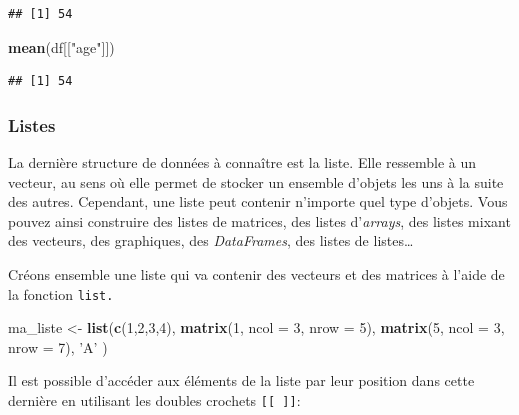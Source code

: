 \documentclass[
  11pt,
  french,
]{book}
\makeatletter
\newenvironment{Shaded}{\begin{snugshade}}{\end{snugshade}}
\newcommand{\DataTypeTok}[1]{\textcolor[rgb]{0.13,0.29,0.53}{#1}}
\newcommand{\DecValTok}[1]{\textcolor[rgb]{0.00,0.00,0.81}{#1}}
\newcommand{\KeywordTok}[1]{\textcolor[rgb]{0.13,0.29,0.53}{\textbf{#1}}}
\newcommand{\NormalTok}[1]{#1}
\newcommand{\StringTok}[1]{\textcolor[rgb]{0.31,0.60,0.02}{#1}}
\newenvironment{kframe}{%
\medskip{}
\setlength{\fboxsep}{.8em}
 \def\at@end@of@kframe{}%
 \ifinner\ifhmode%
  \def\at@end@of@kframe{\end{minipage}}%
  \begin{minipage}{\columnwidth}%
 \fi\fi%
 \def\FrameCommand##1{\hskip\@totalleftmargin \hskip-\fboxsep
 \colorbox{shadecolor}{##1}\hskip-\fboxsep
     \hskip-\linewidth \hskip-\@totalleftmargin \hskip\columnwidth}%
 \MakeFramed {\advance\hsize-\width
   \@totalleftmargin\z@ \linewidth\hsize
   \@setminipage}}%
 {\par\unskip\endMakeFramed%
 \at@end@of@kframe}
\renewenvironment{Shaded}{\begin{kframe}}{\end{kframe}}
\makeatother
\begin{document}
\begin{verbatim}
## [1] 54
\end{verbatim}

\begin{Shaded}
\begin{Highlighting}[]
\KeywordTok{mean}\NormalTok{(df[[}\StringTok{"age"}\NormalTok{]])}
\end{Highlighting}
\end{Shaded}

\begin{verbatim}
## [1] 54
\end{verbatim}

\hypertarget{sect01365}{%
\subsubsection{Listes}\label{sect01365}}

La dernière structure de données à connaître est la liste. Elle ressemble à un vecteur, au sens où elle permet de stocker un ensemble d'objets les uns à la suite des autres. Cependant, une liste peut contenir n'importe quel type d'objets. Vous pouvez ainsi construire des listes de matrices, des listes d'\emph{arrays}, des listes mixant des vecteurs, des graphiques, des \emph{DataFrames}, des listes de listes\ldots{}

Créons ensemble une liste qui va contenir des vecteurs et des matrices à l'aide de la fonction \texttt{list.}

\begin{Shaded}
\begin{Highlighting}[]
\NormalTok{ma_liste <-}\StringTok{ }\KeywordTok{list}\NormalTok{(}\KeywordTok{c}\NormalTok{(}\DecValTok{1}\NormalTok{,}\DecValTok{2}\NormalTok{,}\DecValTok{3}\NormalTok{,}\DecValTok{4}\NormalTok{),}
                 \KeywordTok{matrix}\NormalTok{(}\DecValTok{1}\NormalTok{, }\DataTypeTok{ncol =} \DecValTok{3}\NormalTok{, }\DataTypeTok{nrow =} \DecValTok{5}\NormalTok{),}
                 \KeywordTok{matrix}\NormalTok{(}\DecValTok{5}\NormalTok{, }\DataTypeTok{ncol =} \DecValTok{3}\NormalTok{, }\DataTypeTok{nrow =} \DecValTok{7}\NormalTok{),}
                 \StringTok{'A'}
\NormalTok{                 )}
\end{Highlighting}
\end{Shaded}

Il est possible d'accéder aux éléments de la liste par leur position dans cette dernière en utilisant les doubles crochets \texttt{{[}{[}\ {]}{]}}:
\end{document}
